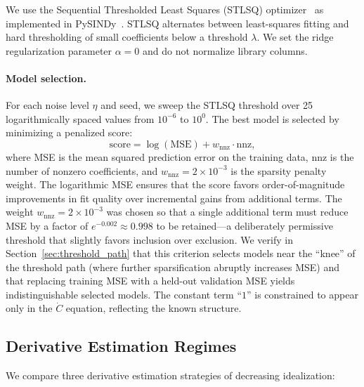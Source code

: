 \documentclass[12pt]{article}
\begin{document}
We use the Sequential Thresholded Least Squares (STLSQ) optimizer~\cite{Brunton2016} as implemented in PySINDy~\cite{deSilva2020,Kaptanoglu2022}.
STLSQ alternates between least-squares fitting and hard thresholding of small coefficients below a threshold $\lambda$.
We set the ridge regularization parameter $\alpha = 0$ and do not normalize library columns.

\paragraph{Model selection.}
For each noise level $\eta$ and seed, we sweep the STLSQ threshold over 25 logarithmically spaced values from $10^{-6}$ to $10^{0}$.
The best model is selected by minimizing a penalized score:
\begin{equation}
\text{score} = \log(\text{MSE}) + w_\text{nnz} \cdot \text{nnz},
\label{eq:model_selection}
\end{equation}
where MSE is the mean squared prediction error on the training data, nnz is the number of nonzero coefficients, and $w_\text{nnz} = 2 \times 10^{-3}$ is the sparsity penalty weight.
The logarithmic MSE ensures that the score favors order-of-magnitude improvements in fit quality over incremental gains from additional terms.
The weight $w_\text{nnz} = 2\times 10^{-3}$ was chosen so that a single additional term must reduce MSE by a factor of $e^{-0.002} \approx 0.998$ to be retained---a deliberately permissive threshold that slightly favors inclusion over exclusion.
We verify in Section~\ref{sec:threshold_path} that this criterion selects models near the ``knee'' of the threshold path (where further sparsification abruptly increases MSE) and that replacing training MSE with a held-out validation MSE yields indistinguishable selected models.
The constant term ``$1$'' is constrained to appear only in the $\dot{C}$ equation, reflecting the known structure.

\subsection{Derivative Estimation Regimes}
\label{sec:derivatives}

We compare three derivative estimation strategies of decreasing idealization:
\end{document}
